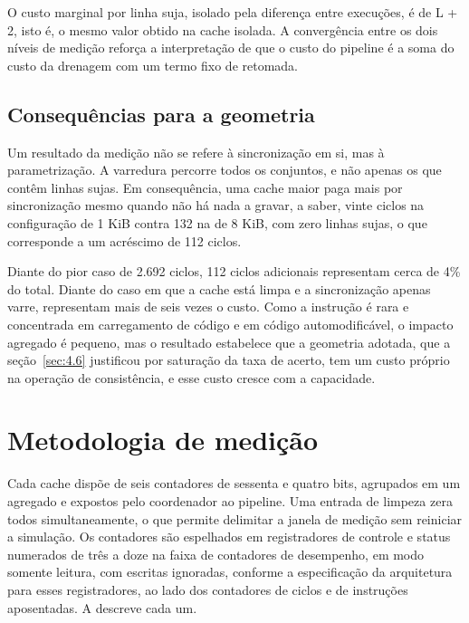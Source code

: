 O custo marginal por linha suja, isolado pela diferença entre execuções, é de L + 2, isto é, o mesmo valor obtido na cache isolada. A convergência entre os dois níveis de medição reforça a interpretação de que o custo do pipeline é a soma do custo da drenagem com um termo fixo de retomada.

\subsection{Consequências para a geometria}\label{sec:4.3.3}

Um resultado da medição não se refere à sincronização em si, mas à parametrização. A varredura percorre todos os conjuntos, e não apenas os que contêm linhas sujas. Em consequência, uma cache maior paga mais por sincronização mesmo quando não há nada a gravar, a saber, vinte ciclos na configuração de 1 KiB contra 132 na de 8 KiB, com zero linhas sujas, o que corresponde a um acréscimo de 112 ciclos.

Diante do pior caso de 2.692 ciclos, 112 ciclos adicionais representam cerca de 4\% do total. Diante do caso em que a cache está limpa e a sincronização apenas varre, representam mais de seis vezes o custo. Como a instrução é rara e concentrada em carregamento de código e em código automodificável, o impacto agregado é pequeno, mas o resultado estabelece que a geometria adotada, que a seção~\ref{sec:4.6} justificou por saturação da taxa de acerto, tem um custo próprio na operação de consistência, e esse custo cresce com a capacidade.

\section{Metodologia de medição}\label{sec:4.4}

Cada cache dispõe de seis contadores de sessenta e quatro bits, agrupados em um agregado e expostos pelo coordenador ao pipeline. Uma entrada de limpeza zera todos simultaneamente, o que permite delimitar a janela de medição sem reiniciar a simulação. Os contadores são espelhados em registradores de controle e status numerados de três a doze na faixa de contadores de desempenho, em modo somente leitura, com escritas ignoradas, conforme a especificação da arquitetura para esses registradores, ao lado dos contadores de ciclos e de instruções aposentadas. A  descreve cada um.

